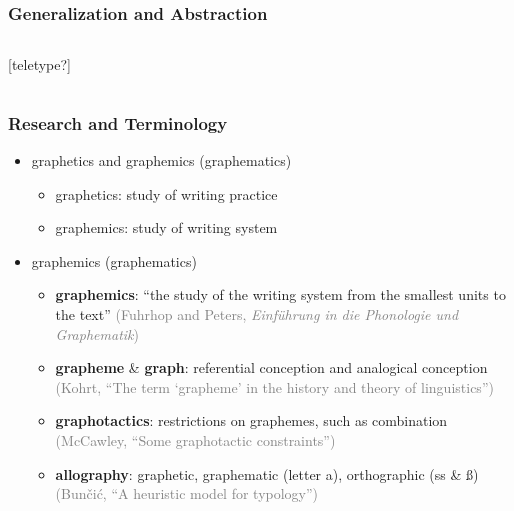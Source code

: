 \documentclass{beamer}
\begin{document}
	\begin{frame}
		\frametitle{Generalization and Abstraction}

		\begin{columns}[c]


			
			\begin{center}
				[teletype?]
			\end{center}
		\end{columns}

	\end{frame}
	
	\begin{frame}
		\frametitle{Research and Terminology}

		\begin{itemize}
			\item graphetics and graphemics (graphematics)
			\begin{itemize}
                \item graphetics: study of writing practice
				\item graphemics: study of writing system
			\end{itemize}
			\item graphemics (graphematics)
			\begin{itemize}
				\item \textbf{graphemics}: ``the study of the writing system from the smallest units to the text'' \textcolor{gray}{(Fuhrhop and Peters, \textit{Einführung in die Phonologie und Graphematik})}
				\item \textbf{grapheme} \& \textbf{graph}: referential conception and analogical conception \textcolor{gray}{(Kohrt, ``The term `grapheme' in the history and theory of linguistics'')}
				\item \textbf{graphotactics}: restrictions on graphemes, such as combination \textcolor{gray}{(McCawley, ``Some graphotactic constraints'')}
				\item \textbf{allography}: graphetic, graphematic (letter a), orthographic (ss \& ß) \textcolor{gray}{(Bunčić, ``A heuristic model for typology'')}
            \end{itemize}
        \end{itemize}
	\end{frame}
\end{document}

